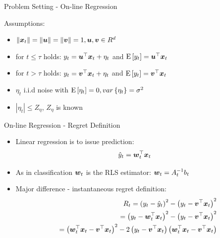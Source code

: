 \documentclass{beamer}
\begin{document}
\begin{frame}{Problem Setting - On-line Regression}

Assumptions:\newline
\begin{itemize}
\item $\|{\boldsymbol{x}}_{t}\|=\|{\boldsymbol{u}}\|=\|{\boldsymbol{v}}\|=1, {\boldsymbol{u}}, {\boldsymbol{v}}\in R^d$\newline
\item for $t\leq\tau$ holds:\newline\newline
 $y_t={{\boldsymbol{u}}}^{\top}{\boldsymbol{x}}_{t}+\eta_t$ and ${\rm E}\left[{y_t}\right]={{\boldsymbol{u}}}^{\top}{\boldsymbol{x}}_{t}$\newline

\item for $t>\tau$ holds:\newline\newline
 $y_t={{\boldsymbol{v}}}^{\top}{\boldsymbol{x}}_{t}+\eta_t$ and ${\rm E}\left[{y_t}\right]={{\boldsymbol{v}}}^{\top}{\boldsymbol{x}}_{t}$\newline
\item $\eta_t$ i.i.d noise with ${\rm E}\left[{\eta_t}\right]=0, var\left\{\eta_t\right\}=\sigma^2$ \newline
\item $\left\vert\eta_t\right\vert\leq Z_{\eta}$, $Z_{\eta}$ is known
\end{itemize}


\end{frame}

\begin{frame}{On-line Regression - Regret Definition}
\begin{itemize}
\item Linear regression is to issue prediction:\newline
\begin{equation*}
\hat{y}_t={{\boldsymbol{w}}}^{\top}_{t}{\boldsymbol{x}}_{t}
\end{equation*}
\item As in classification ${\boldsymbol{w}}_{t}$ is the RLS estimator: ${\boldsymbol{w}}_{t}=A_{t}^{-1}b_t$\newline
\item Major difference - instantaneous regret definition:
\begin{eqnarray*}
&&R_t=\left(y_t-\hat{y}_t\right)^2-\left(y_t-{{\boldsymbol{v}}}^{\top}{\boldsymbol{x}}_{t}\right)^2\\
&&=\left(y_t-{{\boldsymbol{w}}}^{\top}_{t}{\boldsymbol{x}}_{t}\right)^2-\left(y_t-{{\boldsymbol{v}}}^{\top}{\boldsymbol{x}}_{t}\right)^2\\
&&=\left({{\boldsymbol{w}}}^{\top}_{t}{\boldsymbol{x}}_{t}-{{\boldsymbol{v}}}^{\top}{\boldsymbol{x}}_{t}\right)^2-2\left(y_t-{{\boldsymbol{v}}}^{\top}{\boldsymbol{x}}_{t}\right)\left({{\boldsymbol{w}}}^{\top}_{t}{\boldsymbol{x}}_{t}-{{\boldsymbol{v}}}^{\top}{\boldsymbol{x}}_{t}\right)
\end{eqnarray*}
\end{itemize}
\end{frame}
\end{document}
